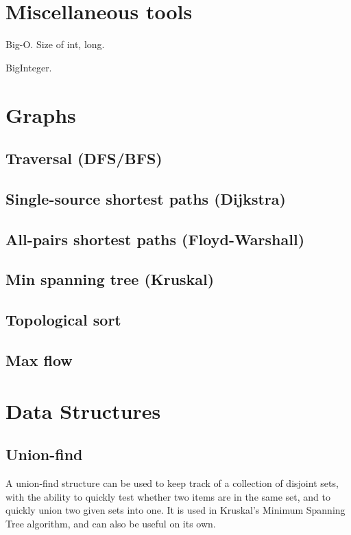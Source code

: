 \documentclass{article}
\begin{document}
\section{Miscellaneous tools}

Big-O.  Size of int, long.

BigInteger.


\section{Graphs}

\subsection{Traversal (DFS/BFS)}

\subsection{Single-source shortest paths (Dijkstra)}

\subsection{All-pairs shortest paths (Floyd-Warshall)}

\subsection{Min spanning tree (Kruskal)} \label{sec:kruskal}

\subsection{Topological sort}

\subsection{Max flow}

\section{Data Structures}

\subsection{Union-find}

A union-find structure can be used to keep track of a collection of
disjoint sets, with the ability to quickly test whether two items are
in the same set, and to quickly union two given sets into one.  It is
used in Kruskal's Minimum Spanning Tree algorithm, and can also be
useful on its own.
\end{document}
